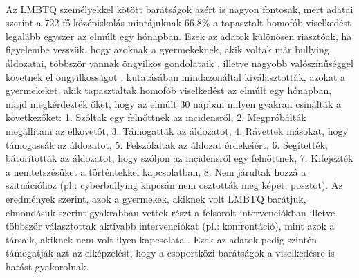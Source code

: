 \\
Az LMBTQ személyekkel kötött barátságok azért is nagyon fontosak, mert \textcite{poteat_vecho_2016} adatai szerint a 722 fő középiskolás mintájuk\-nak 66.8\%-a tapasztalt homofób viselkedést legalább egyszer az elmúlt egy hónapban. Ezek az adatok különösen riasztóak, ha figyelembe vesszük, hogy azoknak a gyermekeknek, akik voltak már bullying áldozatai, többször vannak öngyilkos gondolataik \parencite{hinduja_patchin_2010}, illetve nagyobb valószínűséggel követnek el öngyilkosságot \parencite{hinduja_patchin_2010} . \textcite{poteat_vecho_2016} kutatásában mindazonáltal kiválasztották, azokat a gyermekeket, akik tapasztaltak homofób viselkedést az elmúlt egy hónapban, majd megkérdezték őket, hogy az elmúlt 30 napban milyen gyakran csinálták a következőket: 1. Szóltak egy felnőttnek az incidensről, 2. Megpróbálták megállítani az elkövetőt, 3. Támogatták az áldozatot, 4. Rávettek másokat, hogy támogassák az áldozatot, 5. Felszólaltak az áldozat érdekeiért, 6. Segítették, bátorították az áldozatot, hogy szóljon az incidensről egy felnőttnek, 7. Kifejezték a nemtetszésüket a történtekkel kapcsolatban, 8.  Nem járultak hozzá a szituációhoz (pl.: cyberbullying kapcsán nem osztották meg képet, posztot).
Az eredmények szerint, azok a gyermekek, akiknek volt LMBTQ barátjuk, elmondásuk szerint gyakrabban vettek részt a felsorolt intervenciókban \parencite{poteat_vecho_2016} illetve többször választottak aktívabb intervenciókat (pl.: konfrontáció), mint azok a társaik, akiknek nem volt ilyen kapcsolata \parencite{poteat_vecho_2016}.
Ezek az adatok pedig szintén támogatják azt az elképzelést, hogy a csoportközi barátságok a viselkedésre is hatást gyakorolnak. 
\\
\par
